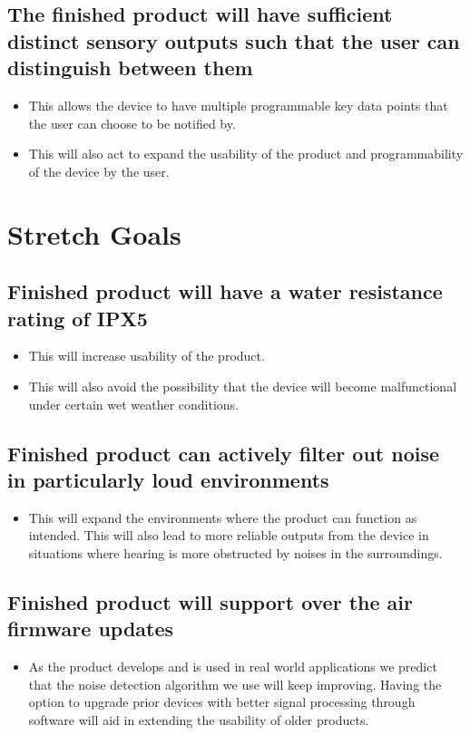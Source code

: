 \documentclass{article}
\begin{document}
 \subsection{The finished product will have sufficient distinct
 sensory outputs such that the user can
 distinguish between them}
 \begin{itemize}
    \item This allows the device to have multiple programmable key data points that the user can choose to be notified by.
    \item This will also act to expand the usability of the product and programmability of the device by the user. 
 \end{itemize} 

\section{Stretch Goals}

\subsection{Finished product will have a water resistance
rating of IPX5}
\begin{itemize}
    \item This will increase usability of the product.
    \item This will also avoid the possibility that the device will become malfunctional under certain wet weather conditions.
 \end{itemize} 


\subsection{Finished product can actively filter out noise in particularly loud environments}
\begin{itemize}
    \item This will expand the environments where
    the product can function as intended.
    This will also lead to more reliable
    outputs from the device in situations
    where hearing is more obstructed by
    noises in the surroundings.
\end{itemize}

\subsection{Finished product will support over the air firmware updates}
\begin{itemize}
    \item As the product develops and is used in
    real world applications we predict that the
    noise detection algorithm we use will keep
    improving. Having the option to upgrade
    prior devices with better signal processing
    through software will aid in extending the
    usability of older products.
    
\end{itemize}
\end{document}
